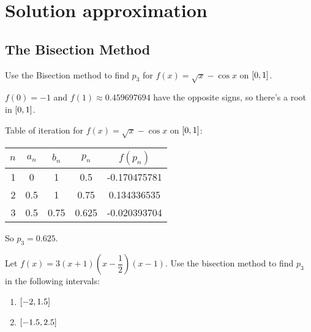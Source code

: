 \documentclass[../../Assignments.tex]{subfiles}
\begin{document}
\chapter{Solution approximation}

\section{The Bisection Method}

\begin{exercise}
    Use the Bisection method to find \(p_3\) for \(f(x) = \sqrt{x} - \cos{x}\) on \(\interval{0}{1}\).
\end{exercise}

\begin{solution}
    \(f(0) = -1\) and \(f(1) \approx \num{0.459697694}\) have the opposite
    signs, so there's a root in \(\interval{0}{1}\).

    Table of iteration for \(f(x) = \sqrt{x} - \cos{x}\) on \(\interval{0}{1}\):

    \begin{table}[H]    %
        \centering
        \begin{tabular}{r S[table-format=1.1] S[table-format=1.2] S[table-format=1.3] S[table-format=-1.9]}
            \toprule
            \(n\)  &  {\(a_n\)}  &  {\(b_n\)}  &  {\(p_n\)}  &  {\(f(p_n)\)}  \\
              &  0          &  1          &  0.5        &  -0.170475781  \\
                2  &  0.5        &  1          &  0.75       &   0.134336535  \\
                3  &  0.5        &  0.75       &  0.625      &  -0.020393704  \\
            \bottomrule
        \end{tabular}
    \end{table}

    So \(p_3 = \num{0.625}\).
\end{solution}

\begin{exercise}
    Let \(f(x) = 3 (x + 1) (x - \dfrac{1}{2}) (x - 1)\). Use the bisection
    method to find \(p_3\) in the following intervals:

    \begin{multicols}{2}
        \begin{enumerate}[label = (\alph*)]
            \item \(\interval{-2}{\num{1.5}}\)
            \item \(\interval{\num{-1.5}}{\num{2.5}}\)
        \end{enumerate}
    \end{multicols}
\end{exercise}
\end{document}
